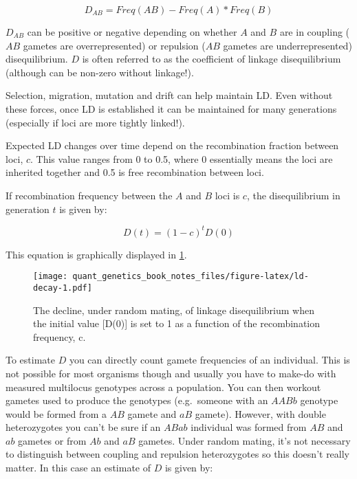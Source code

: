 \documentclass[
]{book}
\begin{document}
\begin{equation}
  D_{AB} = Freq(AB) - Freq(A) * Freq(B)
  \label{eq:LD-D}
\end{equation}

\(D_{AB}\) can be positive or negative depending on whether \(A\) and \(B\) are in coupling (\(AB\) gametes are overrepresented) or repulsion (\(AB\) gametes are underrepresented) disequilibrium. \(D\) is often referred to as the coefficient of linkage disequilibrium (although can be non-zero without linkage!).

Selection, migration, mutation and drift can help maintain LD. Even without these forces, once LD is established it can be maintained for many generations (especially if loci are more tightly linked!).

Expected LD changes over time depend on the recombination fraction between loci, \(c\). This value ranges from 0 to 0.5, where 0 essentially means the loci are inherited together and 0.5 is free recombination between loci.

If recombination frequency between the \(A\) and \(B\) loci is \(c\), the disequilibrium in generation \(t\) is given by:

\begin{equation}
  D(t) = (1 - c)^{t}D(0)
  \label{eq:LD-decay}
\end{equation}

This equation is graphically displayed in \ref{fig:ld-decay}.



\begin{figure}
\centering
\texttt{[image: quant\_genetics\_book\_notes\_files/figure-latex/ld-decay-1.pdf]}
\caption{\label{fig:ld-decay}The decline, under random mating, of linkage disequilibrium when the initial value {[}D(0){]} is set to 1 as a function of the recombination frequency, c.}
\end{figure}

To estimate \(D\) you can directly count gamete frequencies of an individual. This is not possible for most organisms though and usually you have to make-do with measured multilocus genotypes across a population. You can then workout gametes used to produce the genotypes (e.g.~someone with an \(AABb\) genotype would be formed from a \(AB\) gamete and \(aB\) gamete). However, with double heterozygotes you can't be sure if an \(ABab\) individual was formed from \(AB\) and \(ab\) gametes or from \(Ab\) and \(aB\) gametes. Under random mating, it's not necessary to distinguish between coupling and repulsion heterozygotes so this doesn't really matter. In this case an estimate of \(D\) is given by:
\end{document}
